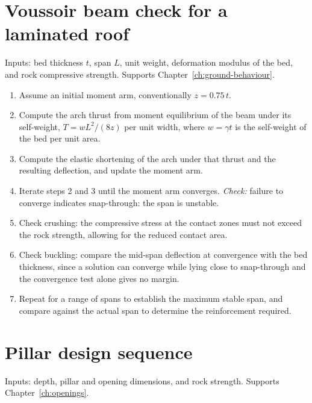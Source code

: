 \section{Voussoir beam check for a laminated roof}
\label{sec:seq-voussoir}

Inputs: bed thickness $t$, span $L$, unit weight, deformation modulus of the
bed, and rock compressive strength. Supports Chapter~\ref{ch:ground-behaviour}.

\begin{enumerate}
  \item Assume an initial moment arm, conventionally $z = 0.75\,t$.
  \item Compute the arch thrust from moment equilibrium of the beam under its
  self-weight, $T = wL^2/(8z)$ per unit width, where $w = \gamma t$ is the
  self-weight of the bed per unit area.
  \item Compute the elastic shortening of the arch under that thrust and the
  resulting deflection, and update the moment arm.
  \item Iterate steps 2 and 3 until the moment arm converges.
  \emph{Check:} failure to converge indicates snap-through: the span is
  unstable.
  \item Check crushing: the compressive stress at the contact zones must not
  exceed the rock strength, allowing for the reduced contact area.
  \item Check buckling: compare the mid-span deflection at convergence with
  the bed thickness, since a solution can converge while lying close to
  snap-through and the convergence test alone gives no margin.
  \item Repeat for a range of spans to establish the maximum stable span, and
  compare against the actual span to determine the reinforcement required.
\end{enumerate}

\section{Pillar design sequence}
\label{sec:seq-pillar}

Inputs: depth, pillar and opening dimensions, and rock strength. Supports
Chapter~\ref{ch:openings}.

